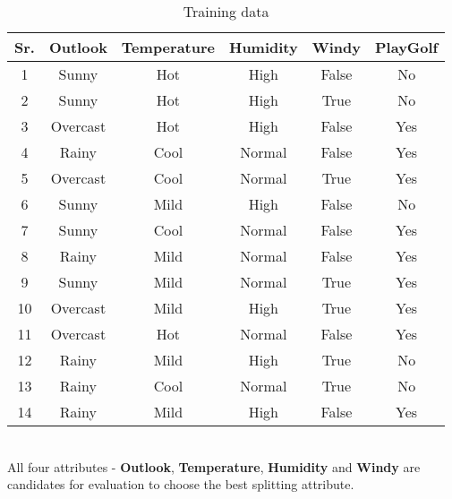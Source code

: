 \documentclass[11pt, a4paper]{article}
\begin{document}
\begin{table}[h!]
	\centering
	\caption{Training data}
	\label{tab:table1}
	\begin{tabular}{c|cccc|c}
		\toprule
		\textbf{Sr.} & \textbf{Outlook} & \textbf{Temperature} & \textbf{Humidity} & \textbf{Windy} & \textbf{PlayGolf} \\
		\midrule
		1            & Sunny            & Hot                  & High              & False          & No                \\
		2            & Sunny            & Hot                  & High              & True           & No                \\
		3            & Overcast         & Hot                  & High              & False          & Yes               \\
		4            & Rainy            & Cool                 & Normal            & False          & Yes               \\
		5            & Overcast         & Cool                 & Normal            & True           & Yes               \\
		6            & Sunny            & Mild                 & High              & False          & No                \\
		7            & Sunny            & Cool                 & Normal            & False          & Yes               \\
		8            & Rainy            & Mild                 & Normal            & False          & Yes               \\
		9            & Sunny            & Mild                 & Normal            & True           & Yes               \\
		10           & Overcast         & Mild                 & High              & True           & Yes               \\
		11           & Overcast         & Hot                  & Normal            & False          & Yes               \\
		12           & Rainy            & Mild                 & High              & True           & No                \\
		13           & Rainy            & Cool                 & Normal            & True           & No                \\
		14           & Rainy            & Mild                 & High              & False          & Yes               \\
		\bottomrule
	\end{tabular}
\end{table}
~\\
All four attributes - \textbf{Outlook}, \textbf{Temperature}, \textbf{Humidity} and \textbf{Windy} are candidates for evaluation to choose the best splitting attribute.
~\\
\end{document}
